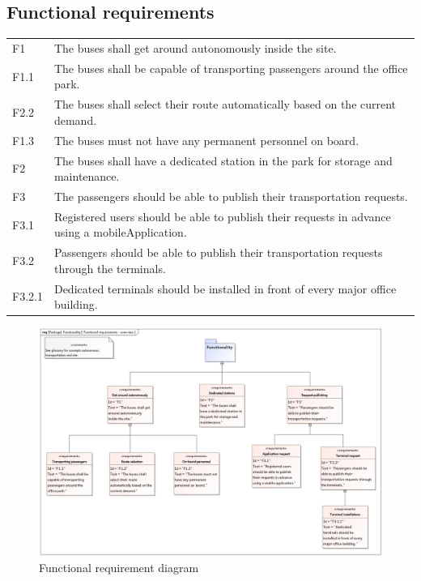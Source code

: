 \documentclass[a4paper]{article}
\begin{document}
\subsection{Functional requirements}
\begin{tabularx}{\textwidth}{p{.9cm} X}
	F1     & The buses shall get around \gls{autonomous}ly inside the
	         \gls{site}. \\

	F1.1   & The buses shall be capable of transporting passengers around
	         the office park. \\

	F2.2   & The buses shall select their \gls{route} \gls{automatically}
	         based on the current demand. \\

        F1.3   & The buses must not have any permanent personnel on board. \\

	F2     & The buses shall have a dedicated \gls{station} in the park for
	         storage and maintenance. \\

	F3     & The passengers should be able to publish their
	         \gls{transportation} \gls{request}s. \\

	F3.1   & Registered users should be able to publish their \gls{request}s
	         in advance using a \gls{mobileApplication}. \\

	F3.2   & Passengers should be able to publish their \gls{transportation}
	         \gls{request}s through the \gls{terminal}s. \\

	F3.2.1 & Dedicated \gls{terminal}s should be installed in front of every
	         major office building. \\
\end{tabularx}

\begin{figure}
	\centering
	\includegraphics[width=\textwidth]{req-functional.jpg}
	\caption{Functional requirement diagram}%
	\label{fig:req-functional}
\end{figure}
\end{document}
